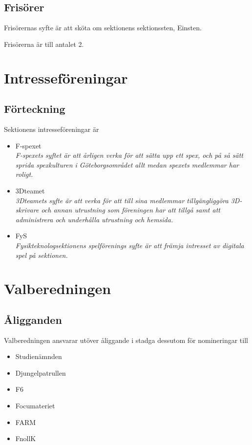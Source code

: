 \documentclass{styrdokument}
\begin{document}
\subsection{Frisörer}
\? Frisörernas syfte är att sköta om sektionens sektionssten, Einsten.
        
\? Frisörerna är till antalet 2.

\section{Intresseföreningar}
\subsection{Förteckning}
\? Sektionens intresseföreningar är
\begin{itemize}
    \item F-spexet \\
        {\itshape F-spexets syftet är att årligen verka för att sätta upp ett spex, och på så sätt sprida spexkulturen i Göteborgsområdet allt medan spexets medlemmar har roligt.}
    \item 3Dteamet \\
        {\itshape 3Dteamets syfte är att verka för att till sina medlemmar tillgängliggöra 3D-skrivare och annan utrustning som föreningen har att tillgå samt att administrera och underhålla utrustning och hemsida.}
    \item FyS \\
        {\itshape Fysikteknologsektionens spelförenings syfte är att främja intresset av digitala spel på sektionen.}
\end{itemize}

\section{Valberedningen}

\subsection{Åligganden}
\? Valberedningen ansvarar utöver åliggande i stadga dessutom för nomineringar till
\begin{itemize}
    \item Studienämnden
    \item Djungelpatrullen
    \item F6
    \item Focumateriet
    \item FARM
    \item FnollK
\end{itemize}
\end{document}
